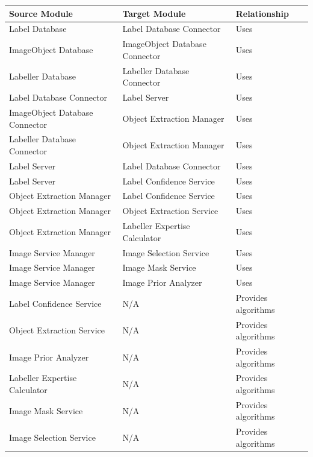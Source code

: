 \documentclass[12pt, titlepage]{article}
\begin{document}
\begin{longtable}{|l|l|l|}
  \hline
  \textbf{Source Module} & \textbf{Target Module} & \textbf{Relationship} \\ \hline
  Label Database & Label Database Connector & Uses \\ \hline
  ImageObject Database & ImageObject Database Connector & Uses \\ \hline
  Labeller Database & Labeller Database Connector & Uses \\ \hline
  Label Database Connector & Label Server & Uses \\ \hline
  ImageObject Database Connector & Object Extraction Manager & Uses \\ \hline
  Labeller Database Connector & Object Extraction Manager & Uses \\ \hline
  Label Server & Label Database Connector & Uses \\ \hline
  Label Server & Label Confidence Service & Uses \\ \hline
  Object Extraction Manager & Label Confidence Service & Uses \\ \hline
  Object Extraction Manager & Object Extraction Service & Uses \\ \hline
  Object Extraction Manager & Labeller Expertise Calculator & Uses \\ \hline
  Image Service Manager & Image Selection Service & Uses \\ \hline
  Image Service Manager & Image Mask Service & Uses \\ \hline
  Image Service Manager & Image Prior Analyzer & Uses \\ \hline
  Label Confidence Service & N/A & Provides algorithms \\ \hline
  Object Extraction Service & N/A & Provides algorithms \\ \hline
  Image Prior Analyzer & N/A & Provides algorithms \\ \hline
  Labeller Expertise Calculator & N/A & Provides algorithms \\ \hline
  Image Mask Service & N/A & Provides algorithms \\ \hline
  Image Selection Service & N/A & Provides algorithms \\ \hline
  \end{longtable}
\end{document}
